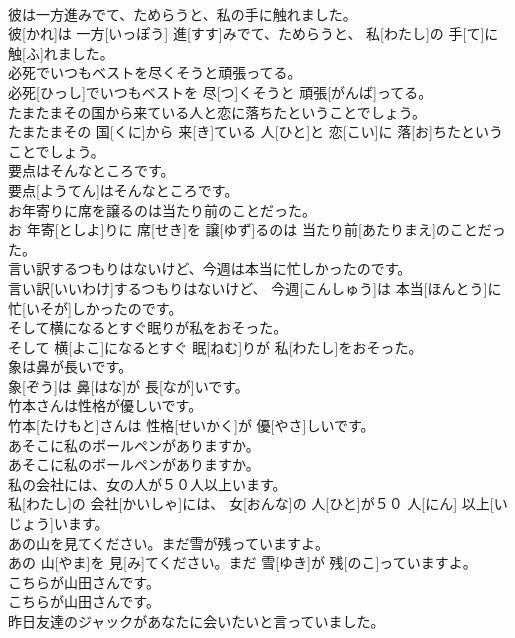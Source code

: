 \documentclass[8pt]{extreport}
\begin{document}
\begin{CJK}{UTF8}{min}
\\	彼は一方進みでて、ためらうと、私の手に触れました。	
\\	彼[かれ]は 一方[いっぽう] 進[すす]みでて、ためらうと、 私[わたし]の 手[て]に 触[ふ]れました。	
\\	必死でいつもベストを尽くそうと頑張ってる。	
\\	必死[ひっし]でいつもベストを 尽[つ]くそうと 頑張[がんば]ってる。	
\\	たまたまその国から来ている人と恋に落ちたということでしょう。	
\\	たまたまその 国[くに]から 来[き]ている 人[ひと]と 恋[こい]に 落[お]ちたということでしょう。	
\\	要点はそんなところです。	
\\	要点[ようてん]はそんなところです。	
\\	お年寄りに席を譲るのは当たり前のことだった。	
\\	お 年寄[としよ]りに 席[せき]を 譲[ゆず]るのは 当たり前[あたりまえ]のことだった。	
\\	言い訳するつもりはないけど、今週は本当に忙しかったのです。	
\\	言い訳[いいわけ]するつもりはないけど、 今週[こんしゅう]は 本当[ほんとう]に 忙[いそが]しかったのです。	
\\	そして横になるとすぐ眠りが私をおそった。	
\\	そして 横[よこ]になるとすぐ 眠[ねむ]りが 私[わたし]をおそった。	
\\	象は鼻が長いです。	
\\	象[ぞう]は 鼻[はな]が 長[なが]いです。	
\\	竹本さんは性格が優しいです。	
\\	竹本[たけもと]さんは 性格[せいかく]が 優[やさ]しいです。	
\\	あそこに私のボールペンがありますか。	
\\	あそこに私のボールペンがありますか。	
\\	私の会社には、女の人が５０人以上います。	
\\	私[わたし]の 会社[かいしゃ]には、 女[おんな]の 人[ひと]が５０ 人[にん] 以上[いじょう]います。	
\\	あの山を見てください。まだ雪が残っていますよ。	
\\	あの 山[やま]を 見[み]てください。まだ 雪[ゆき]が 残[のこ]っていますよ。	
\\	こちらが山田さんです。	
\\	こちらが山田さんです。	
\\	昨日友達のジャックがあなたに会いたいと言っていました。	

\end{CJK}
\end{document}
